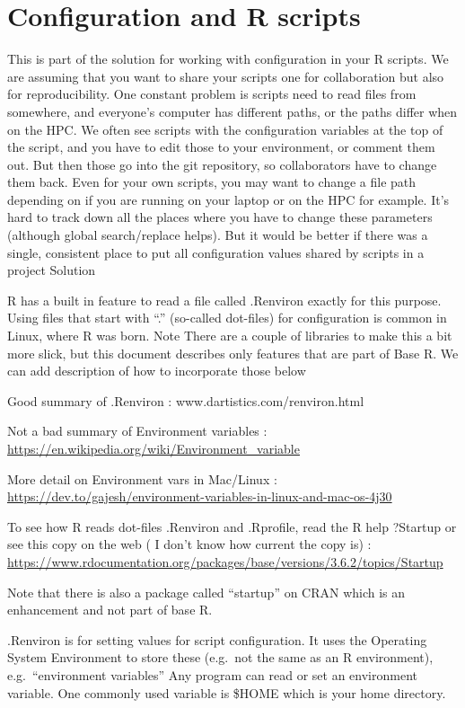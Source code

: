 \documentclass[
]{article}
\begin{document}
\hypertarget{configuration-and-r-scripts}{%
\section{Configuration and R scripts}\label{configuration-and-r-scripts}}

This is part of the solution for working with configuration in your R scripts. We are assuming that you want to share your scripts one for collaboration but also for reproducibility. One constant problem is scripts need to read files from somewhere, and everyone's computer has different paths, or the paths differ when on the HPC. We often see scripts with the configuration variables at the top of the script, and you have to edit those to your environment, or comment them out. But then those go into the git repository, so collaborators have to change them back. Even for your own scripts, you may want to change a file path depending on if you are running on your laptop or on the HPC for example. It's hard to track down all the places where you have to change these parameters (although global search/replace helps). But it would be better if there was a single, consistent place to put all configuration values shared by scripts in a project
Solution

R has a built in feature to read a file called .Renviron exactly for this purpose. Using files that start with ``.'' (so-called dot-files) for configuration is common in Linux, where R was born. Note There are a couple of libraries to make this a bit more slick, but this document describes only features that are part of Base R. We can add description of how to incorporate those below

Good summary of .Renviron : www.dartistics.com/renviron.html

Not a bad summary of Environment variables : \url{https://en.wikipedia.org/wiki/Environment_variable}

More detail on Environment vars in Mac/Linux : \url{https://dev.to/gajesh/environment-variables-in-linux-and-mac-os-4j30}

To see how R reads dot-files .Renviron and .Rprofile, read the R help ?Startup or see this copy on the web ( I don't know how current the copy is) : \url{https://www.rdocumentation.org/packages/base/versions/3.6.2/topics/Startup}

Note that there is also a package called ``startup'' on CRAN which is an enhancement and not part of base R.

.Renviron is for setting values for script configuration. It uses the Operating System Environment to store these (e.g.~not the same as an R environment), e.g.~``environment variables'' Any program can read or set an environment variable. One commonly used variable is \$HOME which is your home directory.
\end{document}
